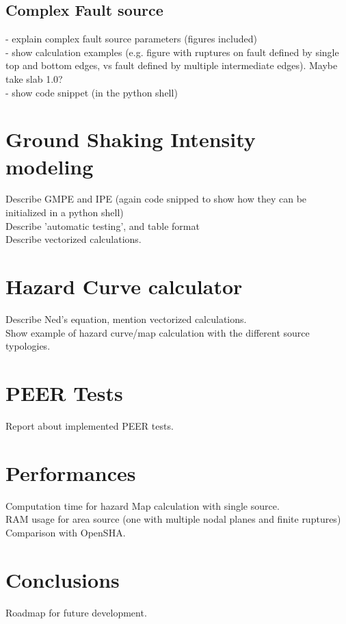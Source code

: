 \documentclass[12pt,a4paper,headings=small,version=first,dvips]{report}
\begin{document}
\subsection*{Complex Fault source}
- explain complex fault source parameters (figures included)\\
- show calculation examples (e.g. figure with ruptures on fault defined by single top and bottom edges, vs fault defined by multiple intermediate edges). Maybe take slab 1.0?\\
- show code snippet (in the python shell)\\

\section*{Ground Shaking Intensity modeling}
Describe GMPE and IPE (again code snipped to show how they can be initialized in a python shell)\\
Describe 'automatic testing', and table format\\
Describe vectorized calculations.\\

\section*{Hazard Curve calculator}
Describe Ned's equation, mention vectorized calculations.\\
Show example of hazard curve/map calculation with the different source typologies.

\section*{PEER Tests}
Report about implemented PEER tests. 

\section*{Performances}
Computation time for hazard Map calculation with single source.\\
RAM usage for area source (one with multiple nodal planes and finite ruptures)\\
Comparison with OpenSHA.

\section*{Conclusions}
Roadmap for future development.
\end{document}
